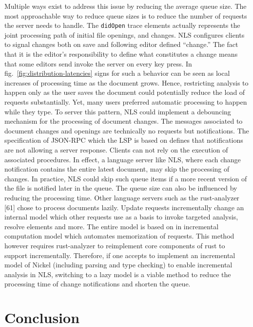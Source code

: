 \documentclass[
  a4paper,
  bibtex,
  english,
  nomenclature]{kthlatex/kththesis/kththesis}
\begin{document}
Multiple ways exist to address this issue by reducing the average queue
size. The most approachable way to reduce queue sizes is to reduce the
number of requests the server needs to handle. The \texttt{didOpen}
trace elements actually represents the joint processing path of initial
file openings, and changes. NLS configures clients to signal changes
both on save and following editor defined ``change.'' The fact that it
is the editor's responsibility to define what constitutes a change means
that some editors send invoke the server on every key press. In
fig.~\ref{fig:distribution-latencies} signs for such a behavior can be
seen as local increases of processing time as the document grows. Hence,
restricting analysis to happen only as the user saves the document could
potentially reduce the load of requests substantially. Yet, many users
preferred automatic processing to happen while they type. To server this
pattern, NLS could implement a debouncing mechanism for the processing
of document changes. The messages associated to document changes and
openings are technically no requests but notifications. The
specification of JSON-RPC which the LSP is based on defines that
notifications are not allowing a server response. Clients can not rely
on the execution of associated procedures. In effect, a language server
like NLS, where each change notification contains the entire latest
document, may skip the processing of changes. In practice, NLS could
skip such queue items if a more recent version of the file is notified
later in the queue. The queue size can also be influenced by reducing
the processing time. Other language servers such as the rust-analyzer
{[}61{]} chose to process documents lazily. Update requests
incrementally change an internal model which other requests use as a
basis to invoke targeted analysis, resolve elements and more. The entire
model is based on in incremental computation model which automates
memorization of requests. This method however requires rust-analyzer to
reimplement core components of rust to support incrementally. Therefore,
if one accepts to implement an incremental model of Nickel (including
parsing and type checking) to enable incremental analysis in NLS,
switching to a lazy model is a viable method to reduce the processing
time of change notifications and shorten the queue.

\hypertarget{sec:conclusion}{%
\chapter{Conclusion}\label{sec:conclusion}}
\end{document}
